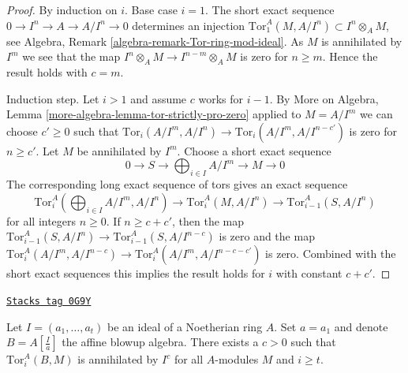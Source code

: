\begin{proof}
By induction on $i$. Base case $i = 1$. The short exact sequence
$0 \to I^n \to A \to A/I^n \to 0$ determines an injection
$\text{Tor}_1^A(M, A/I^n) \subset I^n \otimes_A M$, see
Algebra, Remark \ref{algebra-remark-Tor-ring-mod-ideal}.
As $M$ is annihilated by $I^m$ we see that the map
$I^n \otimes_A M \to I^{n - m} \otimes_A M$ is
zero for $n \geq m$. Hence the result holds with $c = m$.

\medskip\noindent
Induction step. Let $i > 1$ and assume $c$ works for $i - 1$.
By More on Algebra, Lemma \ref{more-algebra-lemma-tor-strictly-pro-zero}
applied to $M = A/I^m$ we can choose $c' \geq 0$ such that
$\text{Tor}_i(A/I^m, A/I^n) \to \text{Tor}_i(A/I^m, A/I^{n - c'})$
is zero for $n \geq c'$. Let $M$ be annihilated by $I^m$. Choose a short
exact sequence
$$
0 \to S \to \bigoplus\nolimits_{i \in I} A/I^m \to M \to 0
$$
The corresponding long exact sequence of tors gives an exact sequence
$$
\text{Tor}_i^A(\bigoplus\nolimits_{i \in I} A/I^m, A/I^n) \to
\text{Tor}_i^A(M, A/I^n) \to
\text{Tor}_{i - 1}^A(S, A/I^n)
$$
for all integers $n \geq 0$. If $n \geq c + c'$, then the map
$\text{Tor}_{i - 1}^A(S, A/I^n) \to \text{Tor}_{i - 1}^A(S, A/I^{n - c})$
is zero and the map $\text{Tor}_i^A(A/I^m, A/I^{n - c}) \to
\text{Tor}_i^A(A/I^m, A/I^{n - c - c'})$ is zero. Combined with the
short exact sequences this implies the result holds for $i$ with
constant $c + c'$.
\end{proof}

\begin{lemma}
\label{local-cohomology-lemma-annihilates-affine}
\href{https://stacks.math.columbia.edu/tag/0G9Y}{\texttt{Stacks tag 0G9Y}}

Let $I = (a_1, \ldots, a_t)$ be an ideal of a Noetherian ring $A$.
Set $a = a_1$ and denote $B = A[\frac{I}{a}]$ the affine blowup algebra.
There exists a $c > 0$ such that $\text{Tor}_i^A(B, M)$ is annihilated
by $I^c$ for all $A$-modules $M$ and $i \geq t$.
\end{lemma}

